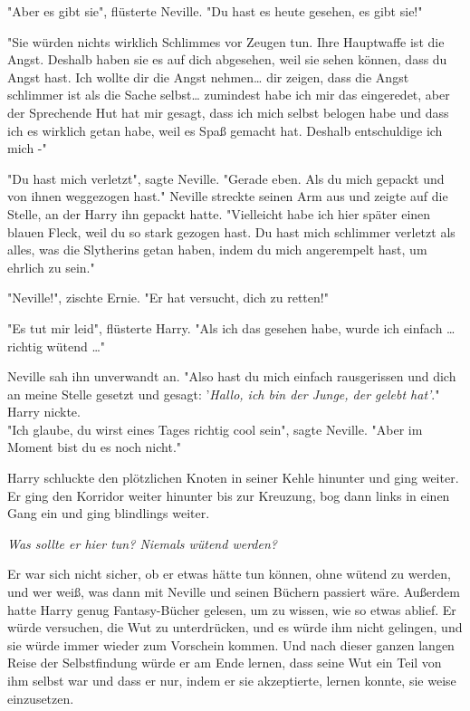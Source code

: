 {"Aber es gibt sie", flüsterte Neville. "Du hast es heute gesehen, es gibt sie!"

"Sie würden nichts wirklich Schlimmes vor Zeugen tun. Ihre Hauptwaffe ist die Angst. Deshalb haben sie es auf dich abgesehen, weil sie sehen können, dass du Angst hast. Ich wollte dir die Angst nehmen… dir zeigen, dass die Angst schlimmer ist als die Sache selbst… zumindest habe ich mir das eingeredet, aber der Sprechende Hut hat mir gesagt, dass ich mich selbst belogen habe und dass ich es wirklich getan habe, weil es Spaß gemacht hat. Deshalb entschuldige ich mich -"

"Du hast mich verletzt", sagte Neville. "Gerade eben. Als du mich gepackt und von ihnen weggezogen hast." Neville streckte seinen Arm aus und zeigte auf die Stelle, an der Harry ihn gepackt hatte. "Vielleicht habe ich hier später einen blauen Fleck, weil du so stark gezogen hast. Du hast mich schlimmer verletzt als alles, was die Slytherins getan haben, indem du mich angerempelt hast, um ehrlich zu sein."

"Neville!", zischte Ernie. "Er hat versucht, dich zu retten!"

"Es tut mir leid", flüsterte Harry. "Als ich das gesehen habe, wurde ich einfach … richtig wütend …"

Neville sah ihn unverwandt an. "Also hast du mich einfach rausgerissen und dich an meine Stelle gesetzt und gesagt: '\emph{Hallo, ich bin der Junge, der gelebt hat'}."\\ Harry nickte.\\ "Ich glaube, du wirst eines Tages richtig cool sein", sagte Neville. "Aber im Moment bist du es noch nicht."

Harry schluckte den plötzlichen Knoten in seiner Kehle hinunter und ging weiter. Er ging den Korridor weiter hinunter bis zur Kreuzung, bog dann links in einen Gang ein und ging blindlings weiter.

\emph{Was sollte er hier tun? Niemals wütend werden?}

Er war sich nicht sicher, ob er etwas hätte tun können, ohne wütend zu werden, und wer weiß, was dann mit Neville und seinen Büchern passiert wäre. Außerdem hatte Harry genug Fantasy-Bücher gelesen, um zu wissen, wie so etwas ablief. Er würde versuchen, die Wut zu unterdrücken, und es würde ihm nicht gelingen, und sie würde immer wieder zum Vorschein kommen. Und nach dieser ganzen langen Reise der Selbstfindung würde er am Ende lernen, dass seine Wut ein Teil von ihm selbst war und dass er nur, indem er sie akzeptierte, lernen konnte, sie weise einzusetzen.

}
